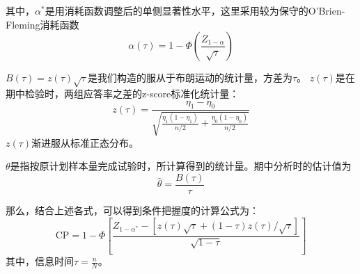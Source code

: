 \documentclass{article}
\begin{document}
其中，$\alpha^*$是用消耗函数调整后的单侧显著性水平，这里采用较为保守的O'Brien-Fleming消耗函数
\[\alpha(\tau)=1-\Phi(\frac{Z_{1-\alpha}}{\sqrt{\tau}})\]

$B(\tau)=z(\tau)\sqrt{\tau}$是我们构造的服从于布朗运动的统计量，方差为$\tau$。
$z(\tau)$是在期中检验时，两组应答率之差的z-score标准化统计量：
\[z(\tau)=\frac{\eta_1-\eta_0}{\sqrt{\frac{\eta_1(1-\eta_1)}{n/2} + \frac{\eta_0(1-\eta_0)}{n/2}}}\]
$z(\tau)$渐进服从标准正态分布。

$\theta$是指按原计划样本量完成试验时，所计算得到的统计量。期中分析时的估计值为
\[\hat{\theta} = \frac{B(\tau)}{\tau}\]

那么，结合上述各式，可以得到条件把握度的计算公式为：
\[\text{CP}=1-\Phi\left[\frac{Z_{1-\alpha^*}-[z(\tau)\sqrt{\tau}+(1-\tau)z(\tau)/\sqrt{\tau}]}
										{\sqrt{1-\tau}}\right] \]
其中，信息时间$\tau=\frac{n}{N}$。









\end{document}
